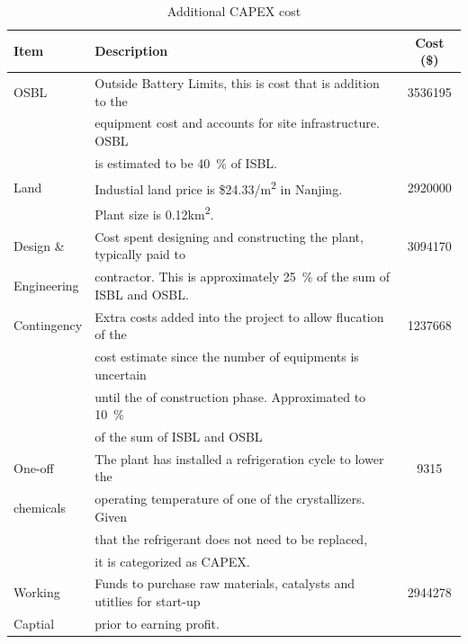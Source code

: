 \begin{table}[H]
\centering
\caption{Additional CAPEX cost}
\label{tab:CAPEXadditional}
\begin{tabular}{llS[table-format=7.0]}
\toprule
\textbf{Item}        & \textbf{Description }                                                                      & \textbf{Cost (\$)}       \\\midrule
OSBL        & Outside Battery Limits, this is cost that is addition to the                      & 3536195 \\
            & equipment cost and accounts for site infrastructure. OSBL                         &           \\
            & is estimated to be \SI{40}{\percent} of ISBL.                                                  &           \\\midrule
Land        & Industial land price is \$24.33/m\textsuperscript{2} in Nanjing. & 2920000 \\
            & Plant size is 0.12km\textsuperscript{2}.                         &           \\\midrule
Design \&   & Cost spent designing and constructing the plant, typically paid to                & 3094170 \\
Engineering & contractor. This is approximately \SI{25}{\percent} of the sum of ISBL and OSBL.               &           \\\midrule
Contingency & Extra costs added into the project to allow flucation of the                      & 1237668 \\
            & cost estimate since the number of equipments is uncertain                         &           \\
            & until the of construction phase. Approximated to \SI{10}{\percent}                             &           \\
            & of the sum of ISBL and OSBL                                                       &           \\\midrule
One-off     & The plant has installed a refrigeration cycle to lower the                        & 9315     \\
chemicals   & operating temperature of one of the crystallizers. Given                          &           \\
            & that the refrigerant does not need to be replaced,                                &           \\
            & it is categorized as CAPEX.                                                       &           \\\midrule
Working     & Funds to purchase raw materials, catalysts and utitlies for start-up              & 2944278 \\
Captial     & prior to earning profit.                                                                    &       \\\bottomrule   
\end{tabular}
\end{table}

